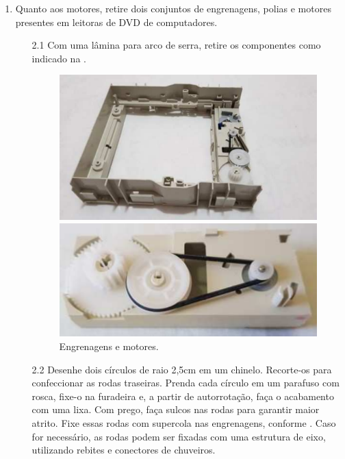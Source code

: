 \documentclass{textolivre-html}
\begin{document}
\begin{enumerate}
\begin{enumerate}
    \end{enumerate}

    \item Quanto aos motores, retire dois conjuntos de engrenagens, polias e motores presentes em leitoras de DVD de computadores.
    \begin{enumerate}
    \item[2.1] Com uma lâmina para arco de serra, retire os componentes como indicado na .

    \begin{figure}[h!]
    \begin{minipage}{0.47\textwidth}
    \includegraphics[width=\linewidth]{figure-03.pdf}
    \subcaption{}
    \end{minipage}
    \hfill
    \begin{minipage}{0.47\textwidth} 
    \includegraphics[width=\linewidth]{figure-04.pdf}
    \subcaption{}
    \end{minipage}
    \caption{Engrenagens e motores.}
    \label{fig02}
    \end{figure}
    
    \item[2.2] Desenhe dois círculos de raio 2,5cm em um chinelo. Recorte-os para
    confeccionar as rodas traseiras. Prenda cada círculo em um parafuso com
    rosca, fixe-o na furadeira e, a partir de autorrotação, faça o acabamento
    com uma lixa. Com prego, faça sulcos nas rodas para garantir maior atrito.
    Fixe essas rodas com supercola nas engrenagens, conforme . Caso for
    necessário, as rodas podem ser fixadas com uma estrutura de eixo,
    utilizando rebites e conectores de chuveiros.


\end{enumerate}
\end{enumerate}
\end{document}
